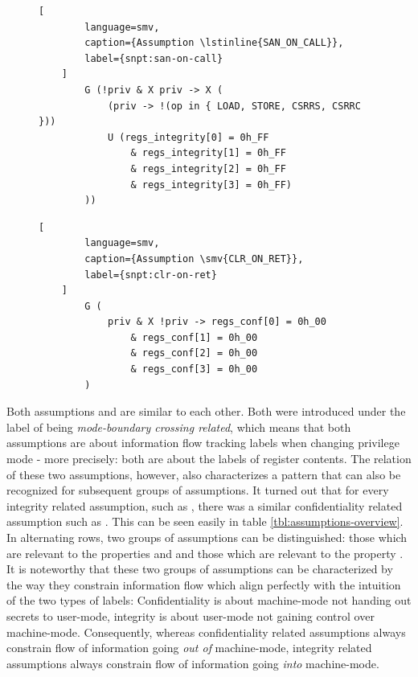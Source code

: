 \begin{figure}
    \begin{lstlisting}[
        language=smv,
        caption={Assumption \lstinline{SAN_ON_CALL}},
        label={snpt:san-on-call}
    ]
        G (!priv & X priv -> X (
            (priv -> !(op in { LOAD, STORE, CSRRS, CSRRC }))
            U (regs_integrity[0] = 0h_FF
                & regs_integrity[1] = 0h_FF
                & regs_integrity[2] = 0h_FF
                & regs_integrity[3] = 0h_FF)
        ))
    \end{lstlisting}

    \begin{lstlisting}[
        language=smv,
        caption={Assumption \smv{CLR_ON_RET}},
        label={snpt:clr-on-ret}
    ]
        G (
            priv & X !priv -> regs_conf[0] = 0h_00
                & regs_conf[1] = 0h_00
                & regs_conf[2] = 0h_00
                & regs_conf[3] = 0h_00
        )
    \end{lstlisting}
\end{figure}

Both assumptions  and  are similar to each other.
Both were introduced under the label of being \textit{mode-boundary crossing related}, which means that both assumptions are about information flow tracking labels when changing privilege mode - more precisely: both are about the labels of register contents.
The relation of these two assumptions, however, also characterizes a pattern that can also be recognized for subsequent groups of assumptions.
It turned out that for every integrity related assumption, such as , there was a similar confidentiality related assumption such as .
This can be seen easily in table \ref{tbl:assumptions-overview}.
In alternating rows, two groups of assumptions can be distinguished: those which are relevant to the properties  and  and those which are relevant to the property .
It is noteworthy that these two groups of assumptions can be characterized by the way they constrain information flow which align perfectly with the intuition of the two types of labels:
Confidentiality is about machine-mode not handing out secrets to user-mode, integrity is about user-mode not gaining control over machine-mode.
Consequently, whereas confidentiality related assumptions always constrain flow of information going \textit{out of} machine-mode, integrity related assumptions always constrain flow of information going \textit{into} machine-mode.

